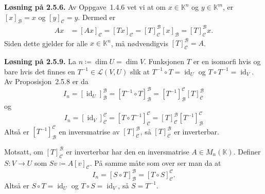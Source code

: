 \documentclass[a4paper,norsk]{article}
\newcommand{\K}{\mathbb{K}}
\renewcommand{\L}{\mathcal{L}}
\DeclareMathOperator{\id}{id}
\newcommand{\basis}{{\mathcal{B}}}
\newcommand{\basiss}{{\mathcal{C}}}
\newcommand{\from}{\colon}
\newenvironment{oppgave}[1]%
	{\trivlist{}\item\relax\textbf{Løsning på #1.}\medspace}%
	{\endtrivlist}
\begin{document}
\begin{oppgave}{2.5.6}
Av Oppgave~1.4.6 vet vi at om $x\in\K^n$ og $y\in\K^m$, er $[x]_\basis=x$ og $[y]_\basiss=y$. Dermed er
\begin{align*}
Ax &= [Ax]_\basiss = [Tx]_\basiss
= [T]_\basiss^\basis[x]_\basis
= [T]_\basiss^\basis x.
\end{align*}
Siden dette gjelder for alle $x\in\K^n$, må nødvendigvis $[T]_\basiss^\basis = A$.
\end{oppgave}


\begin{oppgave}{2.5.9}
La $n\coloneqq\dim U=\dim V$. Funksjonen $T$ er en isomorfi hvis og bare hvis det finnes en $T^{-1}\in\L(V,U)$ slik at $T^{-1}\circ T=\id_U$ og $T\circ T^{-1}=\id_V$. Av Proposisjon~2.5.8 er da
\[
I_n = [\id_U]^\basis_\basis = [T^{-1}\circ T]^\basis_\basis = [T^{-1}]^\basiss_\basis [T]^\basis_\basiss
\]
og
\[
I_n = [\id_V]^\basiss_\basiss = [T\circ T^{-1}]^\basiss_\basiss
= [T]^\basis_\basiss[T^{-1}]^\basiss_\basis
\]
Altså er $[T^{-1}]^\basiss_\basis$ en inversmatrise av $[T]^\basis_\basiss$, så $[T]^\basis_\basiss$ er inverterbar.

Motsatt, om $[T]^\basis_\basiss$ er inverterbar har den en inversmatrise $A\in M_n(\K)$. Definer $S\from V\to U$ som $Sv \coloneqq A[v]_\basiss$. På samme måte som over ser man da at
\[
I_n = [S\circ T]^\basis_\basis = [T\circ S]^\basiss_\basiss.
\]
Altså er $S\circ T = \id_U$ og $T\circ S=\id_V$, så $S = T^{-1}$.
\end{oppgave}
\end{document}
